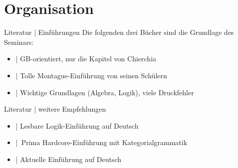 
\section{Organisation}

\begin{frame}
  {Literatur | Einführungen}
  \onslide<+->
  \onslide<+->
  Die folgenden drei Bücher sind die Grundlage des Seminars:\\
  \Zeile
  \begin{itemize}[<+->]
    \item \alert{\citet{ChierchiaMcconnellginet2000}} | GB-orientiert, nur die Kapitel von Chierchia
    \item \alert{\citet{DowtyEa1981}} | Tolle Montague-Einführung von seinen Schülern
    \item \alert{\citet{ParteeEa1990}} | Wichtige Grundlagen (Algebra, Logik), viele Druckfehler
  \end{itemize}
  \onslide<+->
  \centering 
  \large
  \Zeile
\end{frame}

\begin{frame}
  {Literatur | weitere Empfehlungen}
  \onslide<+->
  \begin{itemize}[<+->]
    \item \alert{\citet{Bucher1998}} | Lesbare Logik-Einführung auf Deutsch
    \item \alert{\citet{Carpenter1997}} | Prima Hardcore-Einführung mit Kategorialgrammatik
    \item \alert{\citet{Gutzmann2019}} | Aktuelle Einführung auf Deutsch
  \end{itemize}
\end{frame}


